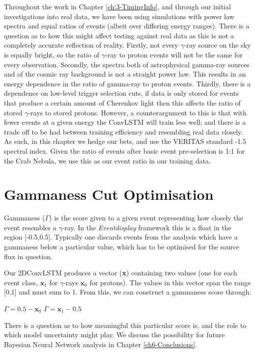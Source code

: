Throughout the work in Chapter \ref{ch:3-TimingInfo}, and through our initial investigations into real data, we have been using simulations with power law spectra and equal ratios of events (albeit over differing energy ranges). There is a question as to how this might affect testing against real data as this is not a completely accurate reflection of reality. Firstly, not every $\gamma$-ray source on the sky is equally bright, so the ratio of $\gamma$-ray to proton events will not be the same for every observation. Secondly, the spectra both of astrophysical gamma-ray sources and of the cosmic ray background is not a straight power law. This results in an energy dependence in the ratio of gamma-ray to proton events. Thirdly, there is a dependence on low-level trigger selection cuts, if data is only stored for events that produce a certain amount of Cherenkov light then this affects the ratio of stored $\gamma$-rays to stored protons. However, a counterargument to this is that with fewer events at a given energy the ConvLSTM will train less well; and there is a trade off to be had between training efficiency and resembling real data closely. As such, in this chapter we hedge our bets, and use the VERITAS standard -1.5 spectral index. Given the ratio of events after basic event pre-selection is 1:1 for the Crab Nebula, we use this as our event ratio in our training data.

\section{Gammaness Cut Optimisation}
Gammaness ($\Gamma$) is the score given to a given event representing how closely the event resembles a $\gamma$-ray. In the \textit{Eventdisplay} framework this is a float in the region [-0.5,0.5]. Typically one discards events from the analysis which have a gammaness below a particular value, which has to be optimised for the source flux in question. 

Our 2DConvLSTM produces a vector (\textbf{x}) containing two values (one for each event class,   $\textbf{x}_1$ for $\gamma$-rays $\textbf{x}_0$ for protons). The values in this vector span the range [0,1] and must sum to 1. From this, we can construct a gammaness score through:

\begin{algorithmic}
    \STATE $\Gamma=0.5-\textbf{x}_0$
    \ELSE
    \STATE $\Gamma=\textbf{x}_1-0.5$
    \ENDIF
\end{algorithmic}
There is a question as to how meaningful this particular score is, and the role to which model uncertainty might play. We discuss the possibility for future Bayesian Neural Network analysis in Chapter \ref{ch6-Conclusions}.


